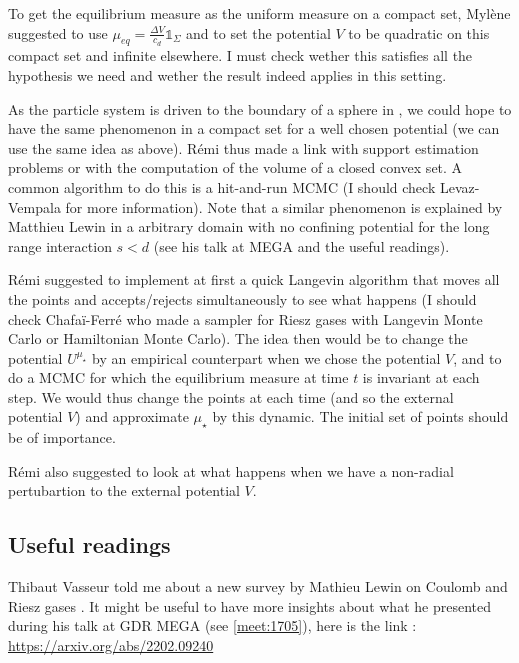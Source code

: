 \documentclass[a4paper,12pt]{report}
\begin{document}
To get the equilibrium measure as the uniform measure on a compact set, Mylène suggested to use $\mu_{eq} = \frac{\Delta V}{c_d} \mathds{1}_{\Sigma}$ and to set the potential $V$ to be quadratic on this compact set and infinite elsewhere. I must check wether this satisfies all the hypothesis we need and wether the result indeed applies in this setting.
\vspace{0.5cm}

As the particle system is driven to the boundary of a sphere in \cite{chafai-saff-womersley}, we could hope to have the same phenomenon in a compact set for a well chosen potential (we can use the same idea as above). Rémi thus made a link with support estimation problems or with the computation of the volume of a closed convex set. A common algorithm to do this is a hit-and-run MCMC (I should check Levaz-Vempala for more information). Note that a similar phenomenon is explained by Matthieu Lewin in a arbitrary domain with no confining potential for the long range interaction $s < d$ (see his talk at MEGA and the useful readings).
\vspace{0.5cm}

Rémi suggested to implement at first a quick Langevin algorithm that moves all the points and accepts/rejects simultaneously to see what happens (I should check Chafa\"i-Ferré who made a sampler for Riesz gases with Langevin Monte Carlo or Hamiltonian Monte Carlo). The idea then would be to change the potential $U^{\mu_{\star}}$ by an empirical counterpart when we chose the potential $V$, and to do a MCMC for which the equilibrium measure at time $t$ is invariant at each step. We would thus change the points at each time (and so the external potential $V$) and approximate $\mu_{\star}$ by this dynamic. The initial set of points should be of importance.
\vspace{0.5cm}

Rémi also suggested to look at what happens when we have a non-radial pertubartion to the external potential $V$.

\subsection*{Useful readings}

Thibaut Vasseur told me about a new survey by Mathieu Lewin on Coulomb and Riesz gases \cite{Lewin_2022}. It might be useful to have more insights about what he presented during his talk at GDR MEGA (see \ref{meet:1705}), here is the link : 
\href{https://arxiv.org/abs/2202.09240}{https://arxiv.org/abs/2202.09240}
\vspace{0.5cm}
\end{document}
